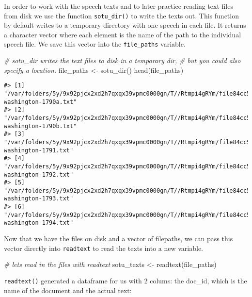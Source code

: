 \documentclass[
]{book}
\newenvironment{Shaded}{\begin{snugshade}}{\end{snugshade}}
\newcommand{\CommentTok}[1]{\textcolor[rgb]{0.56,0.35,0.01}{\textit{#1}}}
\newcommand{\FunctionTok}[1]{\textcolor[rgb]{0.00,0.00,0.00}{#1}}
\newcommand{\NormalTok}[1]{#1}
\newcommand{\OtherTok}[1]{\textcolor[rgb]{0.56,0.35,0.01}{#1}}
\begin{document}
In order to work with the speech texts and to later practice reading text files from disk we use the function \texttt{sotu\_dir()} to write the texts out. This function by default writes to a temporary directory with one speech in each file. It returns a character vector where each element is the name of the path to the individual speech file. We save this vector into the \texttt{file\_paths} variable.

\begin{Shaded}
\begin{Highlighting}[]
\CommentTok{\# sotu\_dir writes the text files to disk in a temporary dir, }
\CommentTok{\# but you could also specify a location.}
\NormalTok{file\_paths }\OtherTok{\textless{}{-}} \FunctionTok{sotu\_dir}\NormalTok{()}
\FunctionTok{head}\NormalTok{(file\_paths)}
\end{Highlighting}
\end{Shaded}

\begin{verbatim}
#> [1] "/var/folders/5y/9x92pjcx2xd2h7qxqx39vpmc0000gn/T//Rtmpi4gRYm/file84cc50999363/george-washington-1790a.txt"
#> [2] "/var/folders/5y/9x92pjcx2xd2h7qxqx39vpmc0000gn/T//Rtmpi4gRYm/file84cc50999363/george-washington-1790b.txt"
#> [3] "/var/folders/5y/9x92pjcx2xd2h7qxqx39vpmc0000gn/T//Rtmpi4gRYm/file84cc50999363/george-washington-1791.txt" 
#> [4] "/var/folders/5y/9x92pjcx2xd2h7qxqx39vpmc0000gn/T//Rtmpi4gRYm/file84cc50999363/george-washington-1792.txt" 
#> [5] "/var/folders/5y/9x92pjcx2xd2h7qxqx39vpmc0000gn/T//Rtmpi4gRYm/file84cc50999363/george-washington-1793.txt" 
#> [6] "/var/folders/5y/9x92pjcx2xd2h7qxqx39vpmc0000gn/T//Rtmpi4gRYm/file84cc50999363/george-washington-1794.txt"
\end{verbatim}

Now that we have the files on disk and a vector of filepaths, we can pass this vector directly into \texttt{readtext} to read the texts into a new variable.

\begin{Shaded}
\begin{Highlighting}[]
\CommentTok{\# let\textquotesingle{}s read in the files with readtext}
\NormalTok{sotu\_texts }\OtherTok{\textless{}{-}} \FunctionTok{readtext}\NormalTok{(file\_paths)}
\end{Highlighting}
\end{Shaded}

\texttt{readtext()} generated a dataframe for us with 2 colums: the doc\_id, which is the name of the document and the actual text:
\end{document}

